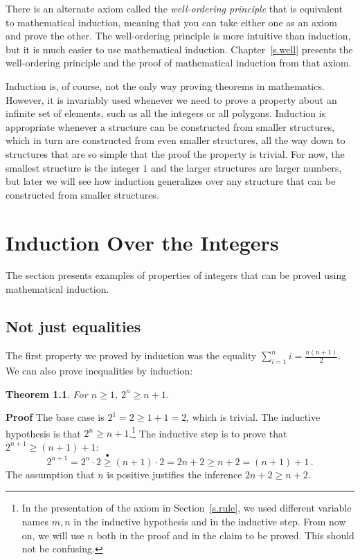 \documentclass[11pt,a4paper]{report}
\newcommand*{\ihge}{\stackrel{\bullet}{\geq}}
\newtheorem{theorem}{Theorem}
\begin{document}
There is an alternate axiom called the \emph{well-ordering principle} that is equivalent to mathematical induction, meaning that you can take either one as an axiom and prove the other. The well-ordering principle is more intuitive than induction, but it is much easier to use mathematical induction. Chapter~\ref{s.well} presents the well-ordering principle and the proof of mathematical induction from that axiom.

Induction is, of course, not the only way proving theorems in mathematics. However, it is invariably used whenever we need to prove a property about an infinite set of elements, such as all the integers or all polygons. Induction is appropriate whenever a structure can be constructed from smaller structures, which in turn are constructed from even smaller structures, all the way down to structures that are so simple that the proof the property is trivial. For now, the smallest structure is the integer $1$ and the larger structures are larger numbers, but later we will see how induction generalizes over any structure that can be constructed from smaller structures.


\chapter{Induction Over the Integers}\label{s.integers}

The section presents examples of properties of integers that can be proved using mathematical induction.

\section{Not just equalities}

The first property we proved by induction was the equality $\sum_{i=1}^n i = \frac{n(n+1)}{2}$. We can also prove inequalities by induction:

\begin{theorem}
For $n\geq 1$, $2^n \geq n+1$.
\end{theorem}

\textbf{Proof} The base case is $2^1=2 \geq 1+1 = 2$, which is trivial. The inductive hypothesis is that $2^n \geq n+1$.\footnote{In the presentation of the axiom in Section~\ref{s.rule}, we used different variable names $m,n$ in the inductive hypothesis and in the inductive step. From now on, we will use $n$ both in the proof and in the claim to be proved. This should not be confusing.} The inductive step is to prove that $2^{n+1} \geq (n+1)+1$:
\[
2^{n+1}= 2^n\cdot 2 \ihge{} (n+1)\cdot 2 = 2n + 2 \geq n+2 = (n+1)+1\,.
\]
The assumption that $n$ is positive justifies the inference $2n+2\geq n+2$.
\end{document}

